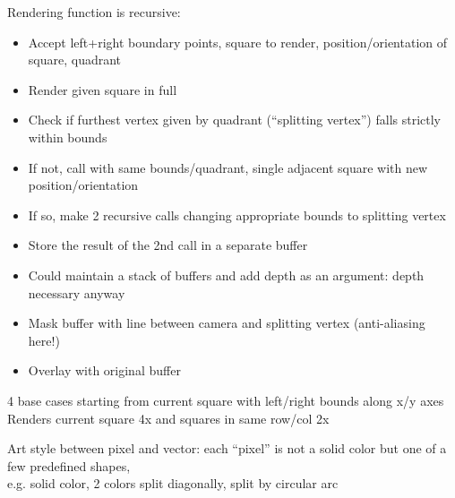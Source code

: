 \documentclass{article}
\begin{document}
Rendering function is recursive:
\begin{itemize}
\item
  Accept left+right boundary points, square to render,
  position/orientation of square, quadrant
\item
  Render given square in full
\item
  Check if furthest vertex given by quadrant (``splitting vertex'') falls strictly within bounds
\item
  If not, call with same bounds/quadrant,
  single adjacent square with new position/orientation
\item
  If so, make 2 recursive calls changing appropriate bounds to splitting vertex
\item
  Store the result of the 2nd call in a separate buffer
\item
  Could maintain a stack of buffers and add depth as an argument: depth necessary anyway
\item
  Mask buffer with line between camera and splitting vertex (anti-aliasing here!)
\item
  Overlay with original buffer
\end{itemize}
4 base cases starting from current square with left/right bounds along x/y axes \\
Renders current square 4x and squares in same row/col 2x

Art style between pixel and vector:
each ``pixel'' is not a solid color but one of a few predefined shapes, \\
e.g. solid color, 2 colors split diagonally, split by circular arc \\
\end{document}
